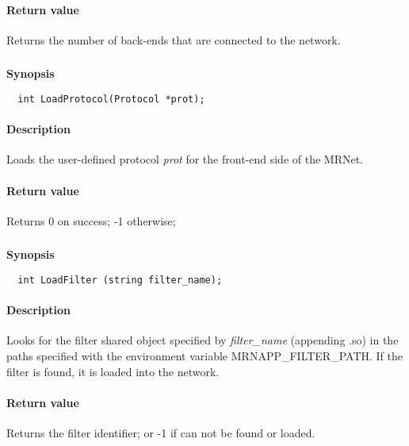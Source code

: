\documentclass[twoside,a4,english,11pt]{book}
\begin{document}
\paragraph{Return value}
  Returns the number of back-ends that are connected to the network.

\subsubsection{}

\textbf{Synopsis}
\begin{lstlisting}
  int LoadProtocol(Protocol *prot);
\end{lstlisting}

\paragraph{Description}
  Loads the user-defined protocol \emph{prot} for the front-end side of the MRNet.

\paragraph{Return value}
  Returns 0 on success; -1 otherwise;

\subsubsection{}

\textbf{Synopsis}
\begin{lstlisting}
  int LoadFilter (string filter_name);
\end{lstlisting}

\paragraph{Description}
  Looks for the filter shared object specified by \emph{filter\_name} (appending .so) 
  in the paths specified with the environment variable MRNAPP\_FILTER\_PATH. If the
  filter is found, it is loaded into the network.

\paragraph{Return value}
  Returns the filter identifier; or -1 if can not be found or loaded. 

\subsubsection{}
\end{document}
